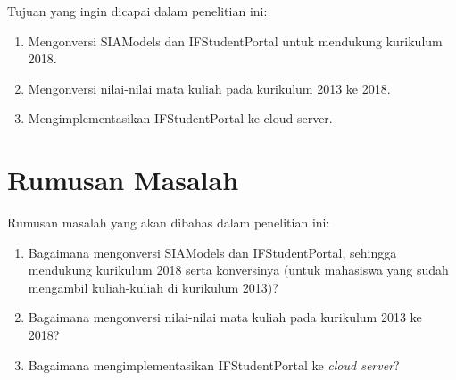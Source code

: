 \documentclass[a4paper,twoside]{article}
\begin{document}
Tujuan yang ingin dicapai dalam penelitian ini:
\begin{enumerate}
	\item Mengonversi SIAModels dan IFStudentPortal untuk mendukung kurikulum 2018.
	\item Mengonversi nilai-nilai mata kuliah pada kurikulum 2013 ke 2018.
	\item Mengimplementasikan IFStudentPortal ke cloud server.
\end{enumerate}

\section{Rumusan Masalah}

Rumusan masalah yang akan dibahas dalam penelitian ini:
\begin{enumerate}
	\item Bagaimana mengonversi SIAModels dan IFStudentPortal, sehingga mendukung kurikulum 2018 serta konversinya (untuk mahasiswa yang sudah mengambil kuliah-kuliah di kurikulum 2013)?
	\item Bagaimana mengonversi nilai-nilai mata kuliah pada kurikulum 2013 ke 2018?
	\item Bagaimana mengimplementasikan IFStudentPortal ke \textit{cloud server}?
\end{enumerate}
\end{document}
